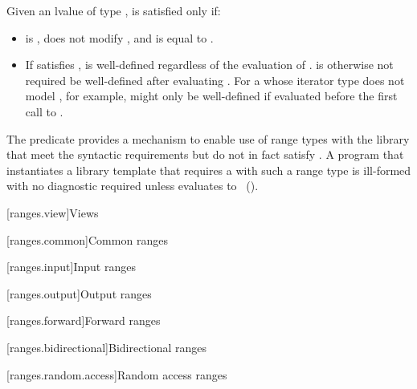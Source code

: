 \begin{itemdescr}
\pnum
Given an lvalue  of type ,
 is satisfied only if:

\begin{itemize}
\item {} is , does not modify , and is equal
to .

\item If  satisfies ,
 is well-defined regardless of the evaluation of
. \enternote {} is otherwise not required be
well-defined after evaluating . For a 
whose iterator type does not model , for
example,  might only be well-defined if evaluated before
the first call to . \exitnote
\end{itemize}

\pnum
\enternote The  predicate provides a mechanism to enable use
of range types with the library that meet the syntactic requirements but do
not in fact satisfy . A program that instantiates a library template
that requires a  with such a range type  is ill-formed with no
diagnostic required unless
 evaluates
to ~(). \exitnote
\end{itemdescr}

[ranges.view]{Views}


[ranges.common]{Common ranges}


[ranges.input]{Input ranges}


[ranges.output]{Output ranges}


[ranges.forward]{Forward ranges}


[ranges.bidirectional]{Bidirectional ranges}


[ranges.random.access]{Random access ranges}

